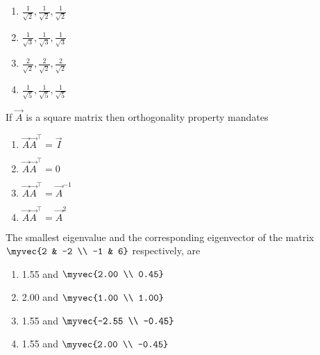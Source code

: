 \begin{multicols}{4}
\begin{enumerate}
    \item $\frac{1}{\sqrt{2}}, \frac{1}{\sqrt{2}}, \frac{1}{\sqrt{2}}$
    \item $\frac{1}{\sqrt{3}}, \frac{1}{\sqrt{3}}, \frac{1}{\sqrt{3}}$
    \item $\frac{2}{\sqrt{2}}, \frac{2}{\sqrt{2}}, \frac{2}{\sqrt{2}}$
    \item $\frac{1}{\sqrt{5}}, \frac{1}{\sqrt{5}}, \frac{1}{\sqrt{5}}$
\end{enumerate}
\end{multicols}
\item If $\vec{A}$ is a square matrix then orthogonality property mandates
\hfill{}
\begin{multicols}{2}
\begin{enumerate}
    \item $\vec{A}\vec{A}^{\top} = \vec{I}$
    \item $\vec{A}\vec{A}^{\top} = 0$
    \item $\vec{A}\vec{A}^{\top} = \vec{A}^{-1}$
    \item $\vec{A}\vec{A}^{\top} = \vec{A}^2$
\end{enumerate}
\end{multicols}
\item The smallest eigenvalue and the corresponding eigenvector of the matrix $\myvec{2 & -2 \\ -1 & 6}$ respectively, are
\hfill{}
\begin{multicols}{4}
\begin{enumerate}
    \item 1.55 and $\myvec{2.00 \\ 0.45}$
    \item 2.00 and $\myvec{1.00 \\ 1.00}$
    \item 1.55 and $\myvec{-2.55 \\ -0.45}$
    \item 1.55 and $\myvec{2.00 \\ -0.45}$
\end{enumerate}
\end{multicols}
